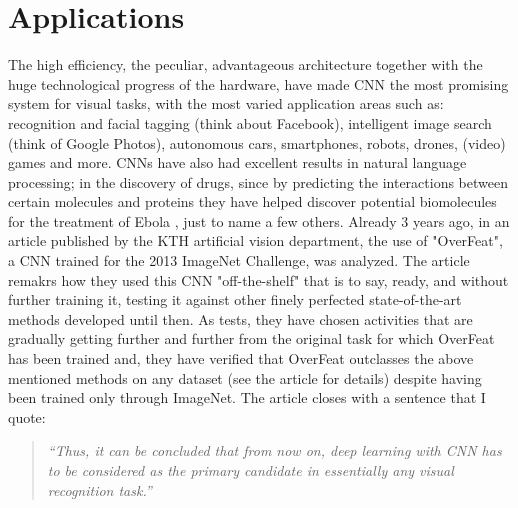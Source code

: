 \section{Applications}The high efficiency, the peculiar, advantageous architecture together with the huge technological progress of the hardware, have made CNN the most promising system for visual tasks, with the most varied application areas such as: recognition and facial tagging (think about Facebook), intelligent image search (think of Google Photos), autonomous cars, smartphones, robots, drones, (video) games and more. CNNs have also had excellent results in natural language processing; in the discovery of drugs, since by predicting the interactions between certain molecules and proteins they have helped discover potential biomolecules for the treatment of Ebola \parencite{WCNN}, just to name a few others. Already 3 years ago, in an article published by the KTH \parencite{Overfeat} artificial vision department, the use of "OverFeat", a CNN trained for the 2013 ImageNet Challenge, was analyzed. The article remakrs how they used this CNN "off-the-shelf" that is to say, ready, and without further training it, testing it against other finely perfected state-of-the-art methods developed until then. As tests, they have chosen activities that are gradually getting further and further from the original task for which OverFeat has been trained and, they have verified that OverFeat outclasses the above mentioned methods on any dataset (see the article for details) despite having been trained only through ImageNet. The article closes with a sentence that I quote:
\begin{quote}
\emph{“Thus, it can be concluded that from now on, deep learning with CNN has to be considered as the primary candidate in essentially any visual recognition task.”}
\end{quote}\\
